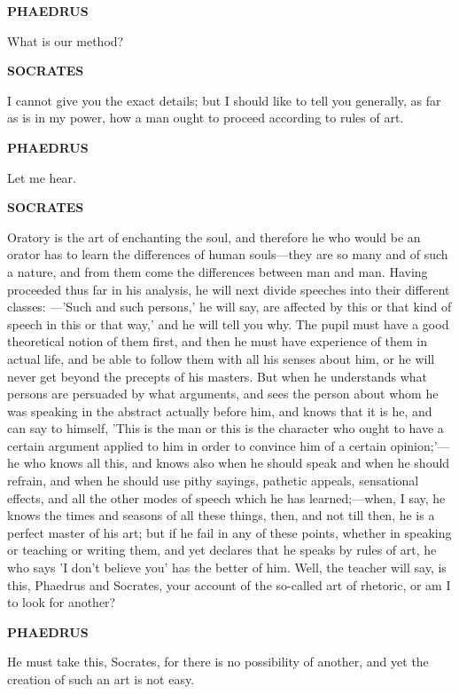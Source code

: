 \documentclass[11pt,letter]{article}
\begin{document}
\par \textbf{PHAEDRUS}
\par   What is our method?

\par \textbf{SOCRATES}
\par   I cannot give you the exact details; but I should like to tell you generally, as far as is in my power, how a man ought to proceed according to rules of art.

\par \textbf{PHAEDRUS}
\par   Let me hear.

\par \textbf{SOCRATES}
\par   Oratory is the art of enchanting the soul, and therefore he who would be an orator has to learn the differences of human souls—they are so many and of such a nature, and from them come the differences between man and man. Having proceeded thus far in his analysis, he will next divide speeches into their different classes: —'Such and such persons,' he will say, are affected by this or that kind of speech in this or that way,' and he will tell you why. The pupil must have a good theoretical notion of them first, and then he must have experience of them in actual life, and be able to follow them with all his senses about him, or he will never get beyond the precepts of his masters. But when he understands what persons are persuaded by what arguments, and sees the person about whom he was speaking in the abstract actually before him, and knows that it is he, and can say to himself, 'This is the man or this is the character who ought to have a certain argument applied to him in order to convince him of a certain opinion;'—he who knows all this, and knows also when he should speak and when he should refrain, and when he should use pithy sayings, pathetic appeals, sensational effects, and all the other modes of speech which he has learned;—when, I say, he knows the times and seasons of all these things, then, and not till then, he is a perfect master of his art; but if he fail in any of these points, whether in speaking or teaching or writing them, and yet declares that he speaks by rules of art, he who says 'I don't believe you' has the better of him. Well, the teacher will say, is this, Phaedrus and Socrates, your account of the so-called art of rhetoric, or am I to look for another?

\par \textbf{PHAEDRUS}
\par   He must take this, Socrates, for there is no possibility of another, and yet the creation of such an art is not easy.
\end{document}
